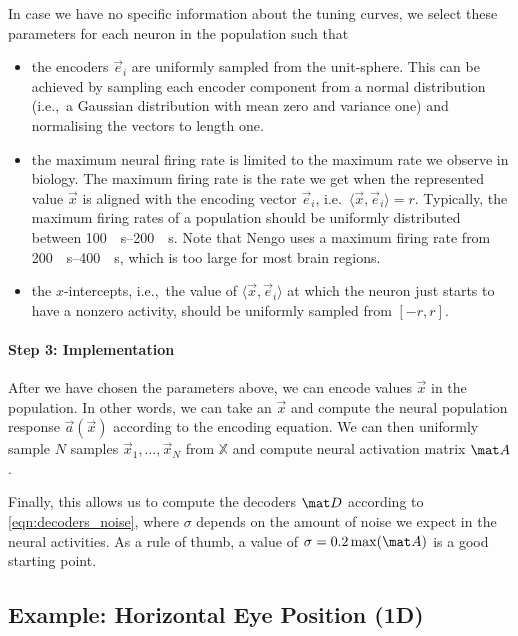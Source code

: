 \documentclass[10pt,letterpaper,oneside]{article}
\begin{document}
In case we have no specific information about the tuning curves, we select these parameters for each neuron in the population such that\textellipsis
\begin{itemize}
	\item \textellipsis the encoders $\vec e_i$ are uniformly sampled from the unit-sphere. This can be achieved by sampling each encoder component from a normal distribution (i.e.,~a Gaussian distribution with mean zero and variance one) and normalising the vectors to length one.
	\item \textellipsis the maximum neural firing rate is limited to the maximum rate we observe in biology. The maximum firing rate is the rate we get when the represented value $\vec x$ is aligned with the encoding vector $\vec e_i$, i.e.~$\langle \vec x, \vec e_i \rangle = r$. Typically, the maximum firing rates of a population should be uniformly distributed between \SIrange{100}{200}{\per\second}. Note that Nengo uses a maximum firing rate from \SIrange{200}{400}{\per\second}, which is too large for most brain regions.
	\item \textellipsis the $x$-intercepts, i.e.,~the value of $\langle \vec x, \vec e_i \rangle$ at which the neuron just starts to have a nonzero activity, should be uniformly sampled from $[-r, r]$.
\end{itemize}

\paragraph{Step 3: Implementation}
After we have chosen the parameters above, we can encode values $\vec x$ in the population. In other words, we can take an $\vec x$ and compute the neural population response $\vec a(\vec x)$ according to the encoding equation. We can then uniformly sample $N$ samples $\vec x_1, \ldots, \vec x_N$ from $\mathbb{X}$ and compute neural activation matrix $\mat A$.

Finally, this allows us to compute the decoders $\mat D$ according to \cref{eqn:decoders_noise}, where $\sigma$ depends on the amount of noise we expect in the neural activities. As a rule of thumb, a value of $\sigma = 0.2 \max(\mat A)$ is a good starting point.


\subsection{Example: Horizontal Eye Position (1D)}
\end{document}
